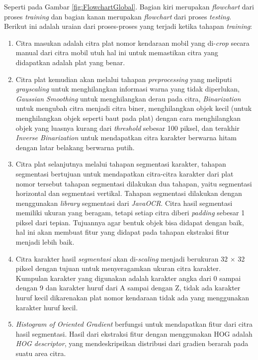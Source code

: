 \noindent Seperti pada Gambar \ref{fig:FlowchartGlobal}. Bagian kiri merupakan \textit{flowchart} dari proses \textit{training} dan bagian kanan merupakan \textit{flowchart} dari proses \textit{testing}. Berikut ini adalah uraian dari proses-proses yang terjadi ketika tahapan \textit{training}:
\begin{enumerate}
	\item Citra masukan adalah citra plat nomor kendaraan mobil yang di-\textit{crop} secara manual dari citra mobil utuh hal ini untuk memastikan citra yang didapatkan adalah plat yang benar. 
	\item Citra plat kemudian akan melalui tahapan \textit{preprocessing} yang meliputi \textit{grayscaling} untuk menghilangkan informasi warna yang tidak diperlukan, \textit{Gaussian Smoothing} untuk menghilangkan derau pada citra, \textit{Binarization} untuk mengubah citra menjadi citra biner, menghilangkan objek kecil (untuk menghilangkan objek seperti baut pada plat) dengan cara menghilangkan objek yang luasnya kurang dari \textit{threshold} sebesar 100 piksel, dan terakhir \textit{Inverse Binarization} untuk mendapatkan citra karakter berwarna hitam dengan latar belakang berwarna putih.
	\item Citra plat selanjutnya melalui tahapan segmentasi karakter, tahapan segmentasi bertujuan untuk mendapatkan citra-citra karakter dari plat nomor tersebut tahapan segmentasi dilakukan dua tahapan, yaitu segmentasi horizontal dan segmentasi vertikal. Tahapan segmentasi dilakukan dengan menggunakan \textit{library} segmentasi dari \textit{JavaOCR}. Citra hasil segmentasi memiliki ukuran yang beragam, tetapi setiap citra diberi \textit{padding} sebesar 1 piksel dari tepian. Tujuannya agar bentuk objek bisa didapat dengan baik, hal ini akan membuat fitur yang didapat pada tahapan ekstraksi fitur menjadi lebih baik.
	\item Citra karakter hasil \textit{segmentasi} akan di-\textit{scaling} menjadi berukuran 32 $\times$ 32 piksel dengan tujuan untuk menyeragamkan ukuran citra karakter. Kumpulan karakter yang digunakan adalah karakter angka dari 0 sampai dengan 9 dan karakter huruf dari A sampai dengan Z, tidak ada karakter huruf kecil dikarenakan plat nomor kendaraan tidak ada yang menggunakan karakter huruf kecil.
	\item \textit{Histogram of Oriented Gradient} berfungsi untuk mendapatkan fitur dari citra hasil segmentasi. Hasil dari ekstraksi fitur dengan menggunakan HOG adalah \textit{HOG descriptor}, yang mendeskripsikan distribusi dari gradien berarah pada suatu area citra.

\end{enumerate}
